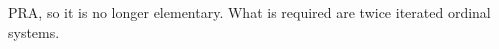 \documentclass[10pt]{article}
\def\lex{\mathrm{lex}}
\def\C{\mathrm{C}}
\def\Ord{\mathrm{Ord}}
\def\PRA{\mathrm{PRA}}
\begin{document}
$\PRA$, so it is no longer elementary. What is required are 
twice iterated ordinal systems.
%
%
%
\end{document}
